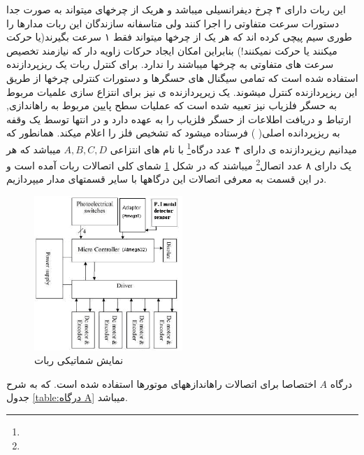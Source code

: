 \documentclass[10pt,a4paper]{article}
\newcommand{\نیمفاصله}{\halfspace}
\renewcommand{\ }{\halfspace}
\begin{document}
این ربات دارای ۴ چرخ دیفرانسیلی می\ باشد و هریک از چرخ\ های میتواند به صورت جدا دستورات سرعت متفاوتی را اجرا کنند ولی متاسفانه سازندگان این ربات مدارها را طوری سیم پیچی کرده اند که هر یک از چرخ\ ها میتواند فقط ۱ سرعت بگیرند(یا حرکت می\ کنند یا حرکت نمی\ کنند!) بنابراین امکان ایجاد حرکات زاویه دار که نیازمند تخصیص سرعت های متفاوتی به چرخ\ ها می\ باشند را ندارد.
برای کنترل ربات یک ریزپردازنده
استفاده شده است که تمامی سیگنال های حسگرها و دستورات کنترلی چرخ\ ها از طریق این ریزپردازنده کنترل میشوند. یک زیرپردازنده ی
نیز برای انتزاع سازی علمیات مربوط به حسگر فلزیاب نیز تعبیه شده است که عملیات سطح پایین مربوط به راه\ اندازی, ارتباط و دریافت اطلاعات از حسگر فلزیاب را به عهده دارد و در انتها توسط یک وقفه به ریزپردانده اصلی(
) فرستاده میشود که تشخیص فلز را اعلام می\ کند.
همانطور که میدانیم ریزپردازنده ی
دارای ۴ عدد درگاه\footnote{}
با نام های انتزاعی
$A, B, C, D$
می\ باشد که هر یک دارای ۸ عدد اتصال\footnote{}
می\ باشند که در شکل
\ref{fig:شما-ربات}
 شمای کلی اتصالات ربات آمده است و در این قسمت به معرفی اتصالات این درگاه\ ها با سایر قسمت\ های مدار می\ پردازیم.
\begin{figure}[H]
    \centering
    \includegraphics[width=0.5\textwidth]{deminer-schema}
    \caption{نمایش شماتیکی ربات}
    \label{fig:شما-ربات}
\end{figure}
درگاه $A$ اختصاصا برای اتصالات راه\ اندازههای موتورها استفاده شده است. که به شرح جدول
\ref{table:درگاه A}
می\ باشد.
\end{document}
